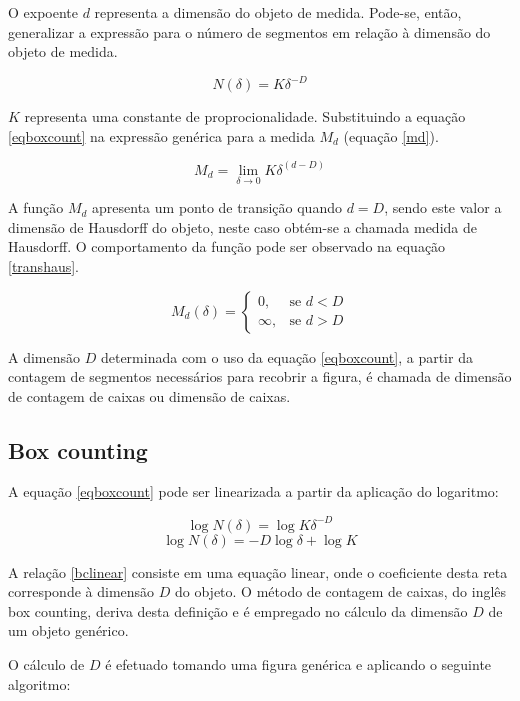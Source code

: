 \documentclass{ufscThesis}
\begin{document}
O expoente $d$ representa a dimensão do objeto de medida. Pode-se, então, generalizar a expressão para o número de segmentos em relação à dimensão do objeto de medida.

\begin{equation}
N(\delta) = K \delta^{-D}
\label{eqboxcount}
\end{equation}

$K$ representa uma constante de proprocionalidade. Substituindo a equação \ref{eqboxcount} na expressão genérica para a medida $M_{d}$ (equação \ref{md}).

\begin{equation}
M_{d} = \lim_{\delta\rightarrow 0} K \delta^{(d - D)}
\end{equation}

A função $M_{d}$ apresenta um ponto de transição quando $d=D$, sendo este valor a dimensão de Hausdorff do objeto, neste caso obtém-se a chamada medida de Hausdorff. O comportamento da função pode ser observado na equação \ref{transhaus}.

\begin{equation}
M_{d}(\delta) = \begin{cases} 0, & \mbox{se } d<D \\ \infty, & \mbox{se } d>D \end{cases}
\label{transhaus}
\end{equation}

A dimensão $D$ determinada com o uso da equação \ref{eqboxcount}, a partir da contagem de segmentos necessários para recobrir a figura, é chamada de dimensão de contagem de caixas ou dimensão de caixas. \cite{feder1988fractals}\par

\subsection{Box counting}

A equação \ref{eqboxcount} pode ser linearizada a partir da aplicação do logaritmo:

\begin{equation}
\log N(\delta) = \log K\delta^{-D}
\end{equation} 
\begin{equation}
\log N(\delta) = -D \log \delta + \log K
\label{bclinear}
\end{equation}

A relação \ref{bclinear} consiste em uma equação linear, onde o coeficiente desta reta corresponde à dimensão $D$ do objeto. O método de contagem de caixas, do inglês box counting, deriva desta definição e é empregado no cálculo da dimensão $D$ de um objeto genérico.\par
O cálculo de $D$ é efetuado tomando uma figura genérica e aplicando o seguinte algoritmo:
\end{document}
